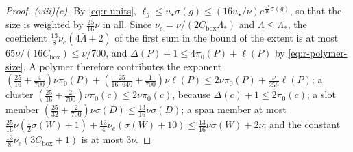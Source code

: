\documentclass[11pt]{preprint}
\numberwithin{equation}{section}
\theoremstyle{definition}
\theoremstyle{remark}
\theoremstyle{plain}
\begin{document}
\begin{proof}
\emph{(viii)(c).} By \eqref{eq:r-units}, $\ell_g \leq u_\star\sigma(g) \leq (16u_\star/\nu)e^{\frac{\nu}{16}\sigma(g)}$, so that the size is weighted by $\frac{25}{16}\nu$ in all. Since $\nu_e = \nu/(2C_{\mathrm{box}}\Lambda_*)$ and $\bar\Lambda \leq \Lambda_*$, the coefficient $\frac{13}{8}\nu_e(4\bar\Lambda + 2)$ of the first sum in the bound of the extent is at most $65\nu/(16C_{\mathrm{box}}) \leq \nu/700$, and $\Delta(P) + 1 \leq 4\pi_0(P) + \ell(P)$ by \eqref{eq:r-polymer-size}. A polymer therefore contributes the exponent $(\frac{25}{16} + \frac{4}{700})\nu\pi_0(P) + (\frac{25}{16 \cdot 640} + \frac{1}{700})\nu\ell(P) \leq 2\nu\pi_0(P) + \frac{\nu}{256}\ell(P)$; a cluster $(\frac{25}{16} + \frac{2}{700})\nu\pi_0(c) \leq 2\nu\pi_0(c)$, because $\Delta(c) + 1 \leq 2\pi_0(c)$; a slot member $(\frac{25}{32} + \frac{2}{700})\nu\sigma(D) \leq \frac{13}{16}\nu\sigma(D)$; a span member at most $\frac{25}{16}\nu(\frac12\sigma(W) + 1) + \frac{13}{4}\nu_e(\sigma(W) + 10) \leq \frac{13}{16}\nu\sigma(W) + 2\nu$; and the constant $\frac{13}{8}\nu_e(3C_{\mathrm{box}} + 1)$ is at most $3\nu$.


\end{proof}
\end{document}
